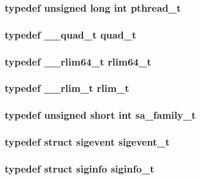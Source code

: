 \subsubsection[{pthread\_\-t}]{\setlength{\rightskip}{0pt plus 5cm}typedef unsigned long int {\bf pthread\_\-t}}\label{tp_8c_a6b301b83a8e16412e1ba8aad8a118c68}
\subsubsection[{quad\_\-t}]{\setlength{\rightskip}{0pt plus 5cm}typedef {\bf \_\-\_\-quad\_\-t} {\bf quad\_\-t}}\label{tp_8c_a8b48981e084c89fce126ab16fdf9dad8}
\subsubsection[{rlim64\_\-t}]{\setlength{\rightskip}{0pt plus 5cm}typedef {\bf \_\-\_\-rlim64\_\-t} {\bf rlim64\_\-t}}\label{tp_8c_a5097b25060052867f43713f4c8d85972}
\subsubsection[{rlim\_\-t}]{\setlength{\rightskip}{0pt plus 5cm}typedef {\bf \_\-\_\-rlim\_\-t} {\bf rlim\_\-t}}\label{tp_8c_ae65eae70522c07cfb230620a6f4afdec}
\subsubsection[{sa\_\-family\_\-t}]{\setlength{\rightskip}{0pt plus 5cm}typedef unsigned short int {\bf sa\_\-family\_\-t}}\label{tp_8c_a2d9e094abb99ebd0874373edf1c45eda}
\subsubsection[{sigevent\_\-t}]{\setlength{\rightskip}{0pt plus 5cm}typedef struct {\bf sigevent}  {\bf sigevent\_\-t}}\label{tp_8c_aab41ed31e585d0e094d08289c6d51efc}
\subsubsection[{siginfo\_\-t}]{\setlength{\rightskip}{0pt plus 5cm}typedef struct {\bf siginfo}  {\bf siginfo\_\-t}}\label{tp_8c_adbd9a9c18dae0a6c15bfff3717b44bda}
